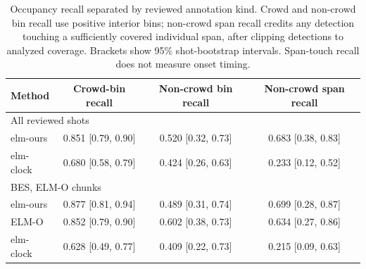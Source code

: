 \begin{table}[t]
\centering
\small
\begin{tabular}{lccc}
\toprule
Method & Crowd-bin recall & Non-crowd bin recall & Non-crowd span recall \\
\midrule
\multicolumn{4}{l}{All reviewed shots} \\
elm-ours & 0.851 {\scriptsize[0.79, 0.90]} & 0.520 {\scriptsize[0.32, 0.73]} & 0.683 {\scriptsize[0.38, 0.83]} \\
elm-clock & 0.680 {\scriptsize[0.58, 0.79]} & 0.424 {\scriptsize[0.26, 0.63]} & 0.233 {\scriptsize[0.12, 0.52]} \\
\midrule
\multicolumn{4}{l}{BES, ELM-O chunks} \\
elm-ours & 0.877 {\scriptsize[0.81, 0.94]} & 0.489 {\scriptsize[0.31, 0.74]} & 0.699 {\scriptsize[0.28, 0.87]} \\
ELM-O & 0.852 {\scriptsize[0.79, 0.90]} & 0.602 {\scriptsize[0.38, 0.73]} & 0.634 {\scriptsize[0.27, 0.86]} \\
elm-clock & 0.628 {\scriptsize[0.49, 0.77]} & 0.409 {\scriptsize[0.22, 0.73]} & 0.215 {\scriptsize[0.09, 0.63]} \\
\bottomrule
\end{tabular}\caption{Occupancy recall separated by reviewed annotation kind. Crowd and non-crowd bin recall use positive interior bins; non-crowd span recall credits any detection touching a sufficiently covered individual span, after clipping detections to analyzed coverage. Brackets show 95\% shot-bootstrap intervals. Span-touch recall does not measure onset timing.}
\label{tab:elm-per-kind}
\end{table}
